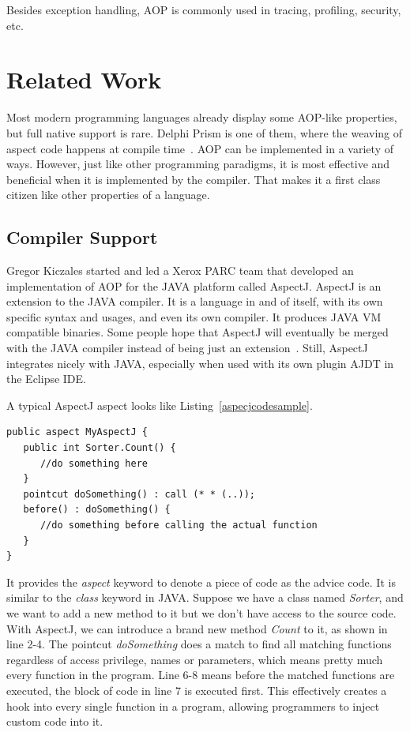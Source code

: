 Besides exception handling, AOP is commonly used in tracing, profiling, security, etc.

\section{Related Work}Most modern programming languages already display some AOP-like properties, but full native support is rare. Delphi Prism is one of them, where the weaving of aspect code happens at compile time~\cite{delphi_prism2010}. AOP can be implemented in a variety of ways. However, just like other programming paradigms, it is most effective and beneficial when it is implemented by the compiler. That makes it a first class citizen like other properties of a language.

\subsection{Compiler Support}

Gregor Kiczales started and led a Xerox PARC team that developed an implementation of AOP for the JAVA platform called AspectJ\cite{aop}. AspectJ is an extension to the JAVA compiler. It is a language in and of itself, with its own specific syntax and usages, and even its own compiler. It produces JAVA VM compatible binaries. Some people hope that AspectJ will eventually be merged with the JAVA compiler instead of being just an extension~\cite{aspectj_faq}. Still, AspectJ integrates nicely with JAVA, especially when used with its own plugin AJDT in the Eclipse IDE.

A typical AspectJ aspect looks like Listing~\ref{aspecjcodesample}.

\begin{lstlisting}[caption={sample AspectJ code}, label=aspecjcodesample]
public aspect MyAspectJ {
   public int Sorter.Count() {
      //do something here
   }
   pointcut doSomething() : call (* * (..));
   before() : doSomething() {
      //do something before calling the actual function
   }
}
\end{lstlisting}

It provides the {\em aspect} keyword to denote a piece of code as the advice code. It is similar to the {\em class} keyword in JAVA. Suppose we have a class named {\em Sorter}, and we want to add a new method to it but we don't have access to the source code. With AspectJ, we can introduce a brand new method {\em Count} to it, as shown in line 2-4. The pointcut {\em doSomething} does a match to find all matching functions regardless of access privilege, names or parameters, which means pretty much every function in the program. Line 6-8 means before the matched functions are executed, the block of code in line 7 is executed first. This effectively creates a hook into every single function in a program, allowing programmers to inject custom code into it.

